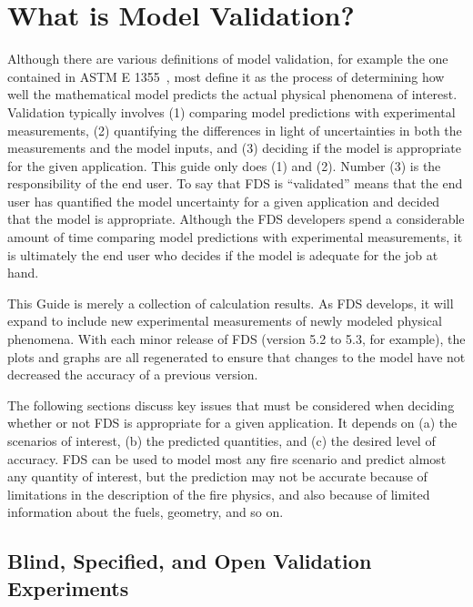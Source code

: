 
\chapter{What is Model Validation?}

Although there are various definitions of model validation, for example the one contained in ASTM E 1355~\cite{ASTM:E1355}, most define it as the process of determining how well the mathematical model predicts the actual physical phenomena of interest. Validation typically involves (1) comparing model predictions with experimental measurements, (2) quantifying the differences in light of uncertainties in both the measurements and the model inputs, and (3) deciding if the model is appropriate for the given application. This guide only does (1) and (2). Number (3) is the responsibility of the end user. To say that FDS is ``validated'' means that the end user has quantified the model uncertainty for a given application and decided that the model is appropriate. Although the FDS developers spend a considerable amount of time comparing model predictions with experimental measurements, it is ultimately the end user who decides if the model is adequate for the job at hand. 

This Guide is merely a collection of calculation results. As FDS develops, it will expand to include new experimental measurements of newly modeled physical phenomena. With each minor release of FDS (version 5.2 to 5.3, for example), the plots and graphs are all regenerated to ensure that changes to the model have not decreased the accuracy of a previous version.

The following sections discuss key issues that must be considered when deciding whether or not FDS is appropriate for a given application. It depends on (a) the scenarios of interest, (b) the predicted quantities, and (c) the desired level of accuracy. FDS can be used to model most any fire scenario and predict almost any quantity of interest, but the prediction may not be accurate because of limitations in the description of the fire physics, and also because of limited information about the fuels, geometry, and so on.


\section{Blind, Specified, and Open Validation Experiments}

